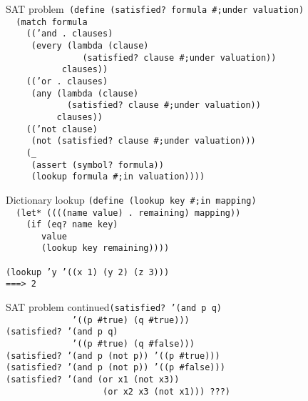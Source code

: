 \documentclass{beamer}
\begin{document}
\begin{frame}{SAT problem}\texttt{\footnotesize
(define (satisfied? formula \#;under valuation)\\
\ \ \pause (match formula \\ \pause
\ \ \ \ (('and . clauses) \\ \pause
\ \ \ \ \ (every (lambda (clause) \\
\ \ \ \ \ \ \ \ \ \ \ \ \ \ \ (satisfied? clause \#;under valuation))\\
\ \ \ \ \ \ \ \ \ \ \ clauses))\\ \pause
\ \ \ \ (('or . clauses) \\ \pause
\ \ \ \ \ (any (lambda (clause)\\
\ \ \ \ \ \ \ \ \ \ \ \ (satisfied? clause \#;under valuation))\\
\ \ \ \ \ \ \ \ \ \ clauses))\\ \pause
\ \ \ \ (('not clause) \\ \pause
\ \ \ \ \ (not (satisfied? clause \#;under valuation))) \\ \pause
\ \ \ \ (\_ \\ \pause
\ \ \ \ \ (assert (symbol? formula))\\
\ \ \ \ \ (lookup formula \#;in valuation))))
}
\end{frame}

\begin{frame}{Dictionary lookup}
\texttt{(define (lookup key \#;in mapping)\\ \pause
\ \ (let* ((((name value)\,.\,remaining)\,mapping))\\ \pause
\ \ \ \ (if (eq? name key)\\
\ \ \ \ \ \ \ value\\ \pause
\ \ \ \ \ \ \ (lookup key remaining))))\\ \pause
\ \\
(lookup 'y '((x 1) (y 2) (z 3)))\\ \pause
===> 2
}
\end{frame}

\begin{frame}{SAT problem continued}\texttt{\pause(satisfied? '(and p q) \\
    \ \ \ \ \ \ \ \ \ \ \ \ \ '((p \#true) (q \#true))) \\ \pause
    (satisfied? '(and p q) \\
    \ \ \ \ \ \ \ \ \ \ \ \ \ '((p \#true) (q \#false))) \\ \pause
    (satisfied? '(and p (not p)) '((p \#true))) \\ \pause
    (satisfied? '(and p (not p)) '((p \#false))) \\ \pause
    (satisfied? '(and (or x1 (not x3))\\
    \ \ \ \ \ \ \ \ \ \ \ \ \ \ \ \ \ \ \ (or x2 x3 (not x1)))\,???)
  }
\end{frame}
\end{document}
